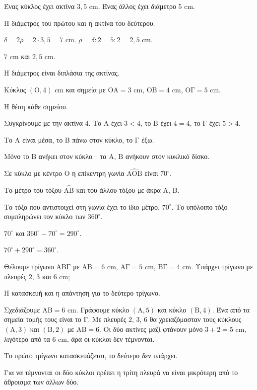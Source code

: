 
\tixero Ένας κύκλος έχει ακτίνα $3{,}5$ cm. Ένας άλλος έχει διάμετρο $5$ cm.\par
\tithelo Η διάμετρος του πρώτου και η ακτίνα του δεύτερου.\par
\possindeo $\delta=2\rho=2\cdot3{,}5=7$ cm. $\rho=\delta:2=5:2=2{,}5$ cm.\par
\apantisi $7$ cm και $2{,}5$ cm.\par
\elegxos Η διάμετρος είναι διπλάσια της ακτίνας.

\tixero Κύκλος $(\mathrm{Ο},4)$ cm και σημεία με $\mathrm{ΟΑ}=3$ cm, $\mathrm{ΟΒ}=4$ cm, $\mathrm{ΟΓ}=5$ cm.\par
\tithelo Η θέση κάθε σημείου.\par
\possindeo Συγκρίνουμε με την ακτίνα $4$. Το $\mathrm{Α}$ έχει $3<4$, το $\mathrm{Β}$ έχει $4=4$, το $\mathrm{Γ}$ έχει $5>4$.\par
\apantisi Το $\mathrm{Α}$ είναι μέσα, το $\mathrm{Β}$ πάνω στον κύκλο, το $\mathrm{Γ}$ έξω.\par
\elegxos Μόνο το $\mathrm{Β}$ ανήκει στον κύκλο· τα $\mathrm{Α}$, $\mathrm{Β}$ ανήκουν στον κυκλικό δίσκο.

\tixero Σε κύκλο με κέντρο $\mathrm{Ο}$ η επίκεντρη γωνία $\widehat{\mathrm{ΑΟΒ}}$ είναι $70^\circ$.\par
\tithelo Το μέτρο του τόξου $\overset{\frown}{\mathrm{ΑΒ}}$ και του άλλου τόξου με άκρα $\mathrm{Α}$, $\mathrm{Β}$.\par
\possindeo Το τόξο που αντιστοιχεί στη γωνία έχει το ίδιο μέτρο, $70^\circ$. Το υπόλοιπο τόξο συμπληρώνει τον κύκλο των $360^\circ$.\par
\apantisi $70^\circ$ και $360^\circ-70^\circ=290^\circ$.\par
\elegxos $70^\circ+290^\circ=360^\circ$.

\tixero Θέλουμε τρίγωνο $\mathrm{ΑΒΓ}$ με $\mathrm{ΑΒ}=6$ cm, $\mathrm{ΑΓ}=5$ cm, $\mathrm{ΒΓ}=4$ cm. Υπάρχει τρίγωνο με πλευρές $2$, $3$ και $6$ cm;\par
\tithelo Η κατασκευή και η απάντηση για το δεύτερο τρίγωνο.\par
\possindeo Σχεδιάζουμε $\mathrm{ΑΒ}=6$ cm. Γράφουμε κύκλο $(\mathrm{Α},5)$ και κύκλο $(\mathrm{Β},4)$. Ένα από τα σημεία τομής τους είναι το $\mathrm{Γ}$. Με πλευρές $2$, $3$, $6$ θα χρειαζόμασταν τους κύκλους $(\mathrm{Α},3)$ και $(\mathrm{Β},2)$ με $\mathrm{ΑΒ}=6$. Οι δύο ακτίνες μαζί φτάνουν μόνο $3+2=5$ cm, λιγότερο από τα $6$ cm, άρα οι κύκλοι δεν τέμνονται.\par
\apantisi Το πρώτο τρίγωνο κατασκευάζεται, το δεύτερο δεν υπάρχει.\par
\elegxos Για να τέμνονται οι δύο κύκλοι πρέπει η τρίτη πλευρά να είναι μικρότερη από το άθροισμα των άλλων δύο.

